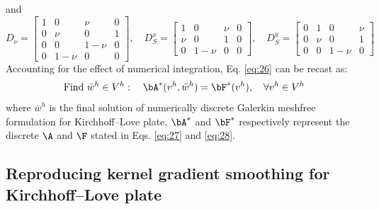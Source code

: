 and
\begin{equation}\label{eq:34}
D_{\nu}=\begin{bmatrix}1&0&\nu&0\\ 0&\nu&0&1\\ 0&0&1-\nu&0\\ 0&1-\nu&0&0\end{bmatrix},\quad
D_S^{x}=\begin{bmatrix}1&0&\nu&0\\ \nu&0&1&0\\ 0&1-\nu&0&0\end{bmatrix},\quad
D_S^{y}=\begin{bmatrix}0&1&0&\nu\\ 0&\nu&0&1\\ 0&0&1-\nu&0\end{bmatrix}
\end{equation}
Accounting for the effect of numerical integration, Eq. \eqref{eq:26} can be recast as:
\begin{equation}\label{eq:35}
\text{Find }\bar{w}^{h}\in V^{h}:\quad \bA^{*}(v^{h},\bar{w}^{h})=\bF^{*}(v^{h}),\quad \forall v^{h}\in V^{h}
\end{equation}
where $\bar{w}^{h}$ is the final solution of numerically discrete Galerkin meshfree formulation for Kirchhoff--Love plate, $\bA^{*}$ and $\bF^{*}$ respectively represent the discrete $\A$ and $\F$ stated in Eqs. \eqref{eq:27} and \eqref{eq:28}.

\subsection{Reproducing kernel gradient smoothing for Kirchhoff--Love plate}\label{sec:rkgs}

